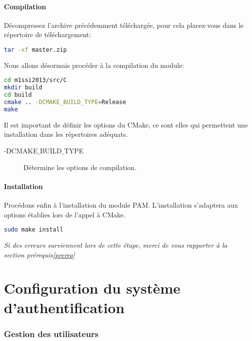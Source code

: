 \documentclass{"../../../res/univ-projet"}
\begin{document}
\subsection{Compilation}
Décompressez l'archive précédemment téléchargée, pour cela placez-vous 
dans le répertoire de téléchargement:
\begin{lstlisting}[language=bash, backgroundcolor=\color{black}, basicstyle=\color{white}]
tar -xf master.zip
\end{lstlisting}
Nous allons désormais procéder à la compilation du module:
\begin{lstlisting}[language=bash, backgroundcolor=\color{black}, basicstyle=\color{white}]
cd m1ssi2013/src/C
mkdir build
cd build
cmake .. -DCMAKE_BUILD_TYPE=Release 
make
\end{lstlisting}

Il est important de définir les options du CMake, ce sont elles qui permettent une installation dans les
répertoires adéquats.
\begin{description}
\item[-DCMAKE$\_$BUILD$\_$TYPE] Détermine les options de compilation.
\end{description}

\subsection{Installation}
Procédons enfin à l'installation du module PAM. L'installation s'adaptera 
aux options établies lors de l'appel à CMake.
\begin{lstlisting}[language=bash, backgroundcolor=\color{black}, basicstyle=\color{white}]
sudo make install
\end{lstlisting}

\textit{Si des erreurs surviennent lors de cette étape, merci de vous 
rapporter à la section prérequis\ref{prereq}}


\newpage

\part{Configuration du système d'authentification}
\section{Gestion des utilisateurs}
\end{document}
